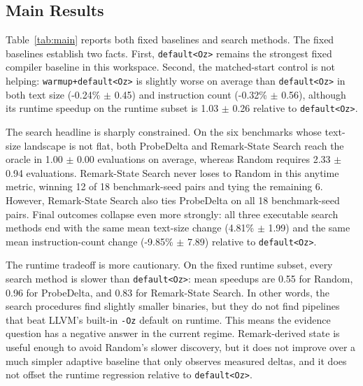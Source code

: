 \documentclass{article}
\newcommand{\method}{Remark-State Search}
\begin{document}
\subsection{Main Results}

Table~\ref{tab:main} reports both fixed baselines and search methods. The fixed baselines establish two facts. First, \texttt{default<Oz>} remains the strongest fixed compiler baseline in this workspace. Second, the matched-start control is not helping: \texttt{warmup+default<Oz>} is slightly worse on average than \texttt{default<Oz>} in both text size (-0.24\% $\pm$ 0.45) and instruction count (-0.32\% $\pm$ 0.56), although its runtime speedup on the runtime subset is 1.03 $\pm$ 0.26 relative to \texttt{default<Oz>}.

The search headline is sharply constrained. On the six benchmarks whose text-size landscape is not flat, both ProbeDelta and \method{} reach the oracle in 1.00 $\pm$ 0.00 evaluations on average, whereas Random requires 2.33 $\pm$ 0.94 evaluations. \method{} never loses to Random in this anytime metric, winning 12 of 18 benchmark-seed pairs and tying the remaining 6. However, \method{} also ties ProbeDelta on all 18 benchmark-seed pairs. Final outcomes collapse even more strongly: all three executable search methods end with the same mean text-size change (4.81\% $\pm$ 1.99) and the same mean instruction-count change (-9.85\% $\pm$ 7.89) relative to \texttt{default<Oz>}.

The runtime tradeoff is more cautionary. On the fixed runtime subset, every search method is slower than \texttt{default<Oz>}: mean speedups are 0.55 for Random, 0.96 for ProbeDelta, and 0.83 for \method{}. In other words, the search procedures find slightly smaller binaries, but they do not find pipelines that beat LLVM's built-in \texttt{-Oz} default on runtime. This means the evidence question has a negative answer in the current regime. Remark-derived state is useful enough to avoid Random's slower discovery, but it does not improve over a much simpler adaptive baseline that only observes measured deltas, and it does not offset the runtime regression relative to \texttt{default<Oz>}.
\end{document}
